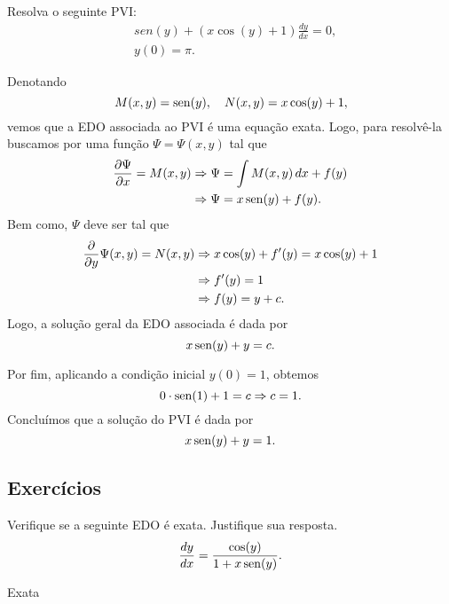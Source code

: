 \begin{exeresol}
  Resolva o seguinte PVI:
  \begin{align}
    &sen(y) + (x\cos(y)+1)\frac{dy}{dx} = 0,\\
    &y(0)=\pi.
  \end{align}
\end{exeresol}
\begin{resol}
  Denotando
  \begin{equation}
    M(x,y) = \operatorname{sen}(y),\quad N(x,y) = x\cos(y)+1,
  \end{equation}
  vemos que a EDO associada ao PVI é uma equação exata. Logo, para resolvê-la buscamos por uma função $\Psi = \Psi(x,y)$ tal que
  \begin{align}
    \frac{\partial \Psi}{\partial x} = M(x,y) &\Rightarrow \Psi = \int M(x,y)\,dx + f(y) \\
                                  &\Rightarrow \Psi = x\operatorname{sen}(y) + f(y).
  \end{align}
  Bem como, $\Psi$ deve ser tal que
  \begin{align}
    \frac{\partial}{\partial y}\Psi(x,y) = N(x,y) &\Rightarrow x\cos(y) + f'(y) = x\cos(y)+1 \\
                                      &\Rightarrow f'(y) = 1 \\
                                      &\Rightarrow f(y) = y + c.
  \end{align}
  Logo, a solução geral da EDO associada é dada por
  \begin{equation}
    x\operatorname{sen}(y) + y = c.
  \end{equation}

  Por fim, aplicando a condição inicial $y(0) = 1$, obtemos
  \begin{equation}
    0\cdot\operatorname{sen}(1)+1 = c \Rightarrow c = 1.
  \end{equation}
  Concluímos que a solução do PVI é dada por
  \begin{equation}
    x\operatorname{sen}(y) + y = 1.
  \end{equation}
\end{resol}

\subsection*{Exercícios}

\begin{exer}
  Verifique se a seguinte EDO é exata. Justifique sua resposta.
  \begin{equation}
    \frac{dy}{dx} = \frac{\cos(y)}{1+x\operatorname{sen}(y)}.
  \end{equation}
\end{exer}
\begin{resp}
  Exata
\end{resp}

